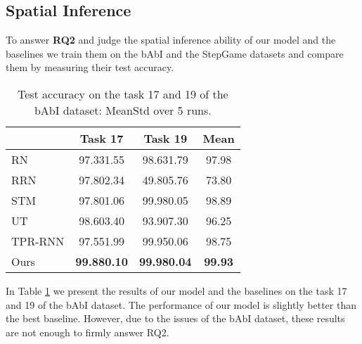\documentclass[letterpaper]{article} \usepackage{aaai22}  \usepackage{times}  \usepackage{helvet}  \usepackage{courier}  \usepackage[hyphens]{url}  \usepackage{graphicx} \urlstyle{rm} \def\UrlFont{\rm}  \usepackage{natbib}  \usepackage{caption} \DeclareCaptionStyle{ruled}{labelfont=normalfont,labelsep=colon,strut=off} \frenchspacing  \setlength{\pdfpagewidth}{8.5in}  \setlength{\pdfpageheight}{11in}  \usepackage{algorithm}
\begin{document}
\subsection{Spatial Inference}
\label{sec:spatial_inference}

To answer \textbf{RQ2} and judge the spatial inference ability of our model and the baselines we train them on the bAbI and the StepGame datasets and compare them by measuring their test accuracy.

\begin{table}[!t]
\centering
\small
\begin{adjustbox}{max width=\textwidth}
\begin{tabular}{p{2.3cm}|cc|c}
\hline
\hline
\multicolumn{1}{c|}{} & Task 17 & Task 19 & Mean \\ \hline
RN    & 97.331.55 & 98.631.79 & 97.98 \\
RRN & 97.802.34 & 49.805.76 & 73.80 \\
STM & 97.801.06 & 99.980.05 & 98.89 \\
UT & 98.603.40 & 93.907.30 & 96.25 \\ 
TPR-RNN & 97.551.99 & 99.950.06 & 98.75 \\
\hline
Ours & \textbf{99.880.10} & \textbf{99.980.04} & \textbf{99.93} \\ \hline
\hline
\end{tabular}
\end{adjustbox}
\caption{Test accuracy on the task 17 and 19 of the bAbI dataset: MeanStd over 5 runs.}
\label{tbl:babi_17_19}
\end{table} 
 
In Table \ref{tbl:babi_17_19} we present the results of our model and the baselines on the task 17 and 19 of the bAbI dataset. 
The performance of our model is slightly better than the best baseline. However, due to the issues of the bAbI dataset, these results are not enough to firmly answer RQ2. 
\end{document}

